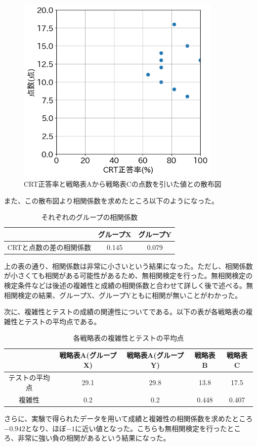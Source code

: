 \begin{figure}[H]
    \begin{center}
        \includegraphics[width=10cm]{figure/experiment-groupY_crt_diffAC.png}
        \caption{CRT正答率と戦略表Aから戦略表Cの点数を引いた値との散布図}
    \end{center}
\end{figure}
また、この散布図より相関係数を求めたところ以下のようになった。
\begin{table}[H]
    \begin{center}
    \caption{それぞれのグループの相関係数}
    \begin{tabular}{|c|c|c|}
    \hline
                  & グループX & グループY \\ \hline
    CRTと点数の差の相関係数 & 0.145 & 0.079 \\ \hline
    \end{tabular}
    \end{center}
\end{table}
上の表の通り、相関係数は非常に小さいという結果になった。ただし、相関係数が小さくても相関がある可能性があるため、無相関検定を行った。無相関検定の検定条件などは後述の複雑性と成績の相関係数と合わせて詳しく後で述べる。無相関検定の結果、グループX、グループYともに相関が無いことがわかった。

次に、複雑性とテストの成績の関連性についてである。以下の表が各戦略表の複雑性とテストの平均点である。
\begin{table}[H]
    \begin{center}
        \caption{各戦略表の複雑性とテストの平均点}
    \begin{tabular}{|c|c|c|c|c|}
    \hline
            & 戦略表A(グループX) & 戦略表A(グループY) & 戦略表B  & 戦略表C  \\ \hline
    テストの平均点 & 29.1        & 29.8        & 13.8  & 17.5  \\ \hline
    複雑性     & 0.2         & 0.2         & 0.448 & 0.407 \\ \hline
    \end{tabular}
    \end{center}
\end{table}
さらに、実験で得られたデータを用いて成績と複雑性の相関係数を求めたところ$-0.942$となり、ほぼ$-1$に近い値となった。こちらも無相関検定を行ったところ、非常に強い負の相関があるという結果になった。

